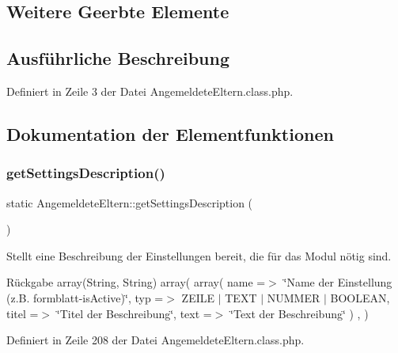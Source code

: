 \subsection*{Weitere Geerbte Elemente}


\subsection{Ausführliche Beschreibung}


Definiert in Zeile 3 der Datei Angemeldete\+Eltern.\+class.\+php.



\subsection{Dokumentation der Elementfunktionen}
\mbox{\label{class_angemeldete_eltern_a96b258e5e03fe9a853da189bd40934c8}} 
\subsubsection{\texorpdfstring{get\+Settings\+Description()}{getSettingsDescription()}}
{\footnotesize\ttfamily static Angemeldete\+Eltern\+::get\+Settings\+Description (\begin{DoxyParamCaption}{ }\end{DoxyParamCaption})\hspace{0.3cm}{\ttfamily [static]}}

Stellt eine Beschreibung der Einstellungen bereit, die für das Modul nötig sind. \begin{DoxyReturn}{Rückgabe}
array(\+String, String) array( array( \textquotesingle{}name\textquotesingle{} =$>$ \char`\"{}\+Name der Einstellung (z.\+B. formblatt-\/is\+Active)\char`\"{}, \textquotesingle{}typ\textquotesingle{} =$>$ Z\+E\+I\+LE $\vert$ T\+E\+XT $\vert$ N\+U\+M\+M\+ER $\vert$ B\+O\+O\+L\+E\+AN, \textquotesingle{}titel\textquotesingle{} =$>$ \char`\"{}\+Titel der Beschreibung\char`\"{}, \textquotesingle{}text\textquotesingle{} =$>$ \char`\"{}\+Text der Beschreibung\char`\"{} ) , ) 
\end{DoxyReturn}


Definiert in Zeile 208 der Datei Angemeldete\+Eltern.\+class.\+php.

